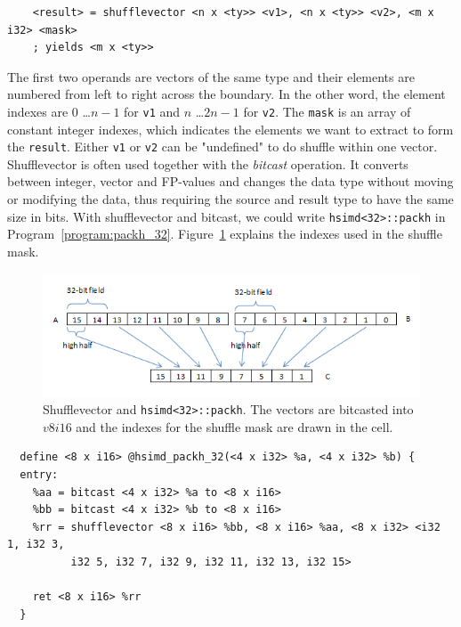 \begin{verbatim}
    <result> = shufflevector <n x <ty>> <v1>, <n x <ty>> <v2>, <m x i32> <mask>
    ; yields <m x <ty>>
\end{verbatim}

The first two operands are vectors of the same type and their elements are numbered from left to right across the boundary. In the other word, the element indexes are $0$ \ldots $n-1$ for {\tt v1} and $n$ \ldots $2n-1$ for {\tt v2}. The {\tt mask} is an array of constant integer indexes, which indicates the elements we want to extract to form the {\tt result}. Either {\tt v1} or {\tt v2} can be "undefined" to do shuffle within one vector. Shufflevector is often used together with the \textit{bitcast} operation. It converts between integer, vector and FP-values and changes the data type without moving or modifying the data, thus requiring the source and result type to have the same size in bits. With shufflevector and bitcast, we could write {\tt hsimd<32>::packh} in Program~\ref{program:packh_32}. Figure~\ref{figure:packh_32} explains the indexes used in the shuffle mask.

\begin{figure}[ht!]
\centering
\includegraphics[width=130mm]{draw/packh_16.png}
\caption[Implement {\tt hsimd<32>::packh} with shufflevector]{Shufflevector and {\tt hsimd<32>::packh}. The vectors are bitcasted into $v8i16$ and the indexes for the shuffle mask are drawn in the cell.}
\label{figure:packh_32}
\end{figure}

\begin{program}
\begin{verbatim}
  define <8 x i16> @hsimd_packh_32(<4 x i32> %a, <4 x i32> %b) {
  entry:
    %aa = bitcast <4 x i32> %a to <8 x i16>
    %bb = bitcast <4 x i32> %b to <8 x i16>
    %rr = shufflevector <8 x i16> %bb, <8 x i16> %aa, <8 x i32> <i32 1, i32 3,
          i32 5, i32 7, i32 9, i32 11, i32 13, i32 15>

    ret <8 x i16> %rr
  }
\end{verbatim}
\caption[Shufflevector implementation of packh.]{Shufflevector and {\tt hsimd<32>::packh} in LLVM IR\@. Horizontal operations half the width of fields and that effect is reflected in the return value type.}
\label{program:packh_32}
\end{program}

